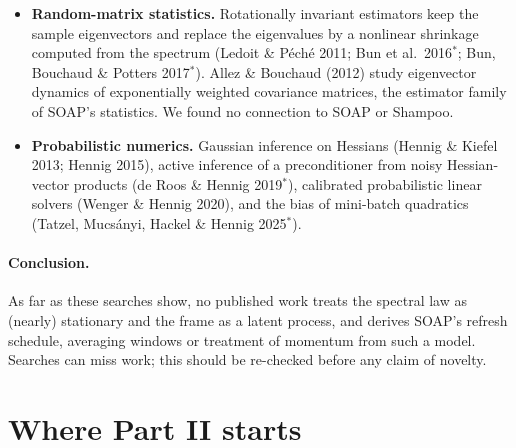 \documentclass[11pt,a4paper]{article}
\theoremstyle{plain}
\theoremstyle{definition}
\theoremstyle{remark}
\begin{document}
\begin{itemize}
  Hessian eigenvectors under SGD and Adam; they do not connect it to spectral stability or to SOAP.
\item \textbf{Random-matrix statistics.} Rotationally invariant estimators keep the sample eigenvectors and replace
  the eigenvalues by a nonlinear shrinkage computed from the spectrum (Ledoit \& P\'ech\'e 2011; Bun et al.\
  2016$^*$; Bun, Bouchaud \& Potters 2017$^*$). Allez \& Bouchaud (2012) study eigenvector dynamics of exponentially
  weighted covariance matrices, the estimator family of SOAP's statistics. We found no connection to SOAP or
  Shampoo.
\item \textbf{Probabilistic numerics.} Gaussian inference on Hessians (Hennig \& Kiefel 2013; Hennig 2015), active
  inference of a preconditioner from noisy Hessian-vector products (de Roos \& Hennig 2019$^*$), calibrated
  probabilistic linear solvers (Wenger \& Hennig 2020), and the bias of mini-batch quadratics (Tatzel, Mucs\'anyi,
  Hackel \& Hennig 2025$^*$).
\end{itemize}

\paragraph{Conclusion.} As far as these searches show, no published work treats the spectral law as (nearly)
stationary and the frame as a latent process, and derives SOAP's refresh schedule, averaging windows or treatment of
momentum from such a model. Searches can miss work; this should be re-checked before any claim of novelty.

\section{Where Part II starts}\label{sec:next}
\end{document}

